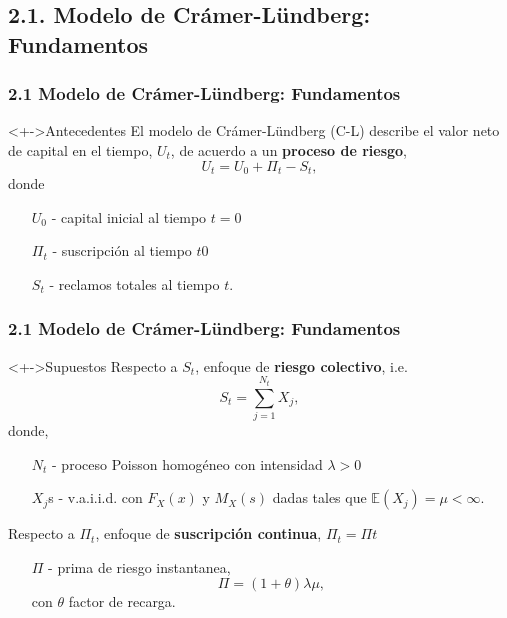 \documentclass[cjk,t,compress]{beamer}
\begin{document}
\subsection{2.1. Modelo de Cr\'amer-L\"undberg: Fundamentos}
\begin{frame}[fragile]
\frametitle{2.1 Modelo de Cr\'amer-L\"undberg: Fundamentos}
\scriptsize  	

\vspace{0.1cm}
\begin{block}<+->{Antecedentes}
	\vspace{0.1cm}
	El modelo de Cr\'amer-L\"undberg (C-L) describe el valor neto de capital en el tiempo, $U_t$, de acuerdo a un {\bf proceso de riesgo},
	\begin{equation}
		U_t = U_0 + \Pi_t - S_t,
	\end{equation}
	donde
	\begin{itemize}
		\item[$U_0$] - capital inicial al tiempo $t=0$
		\item[$\Pi_t$] - suscripci\'on al tiempo $t0$
		\item[$S_t$] - reclamos totales al tiempo $t$.   
	\end{itemize}
\end{block}

\end{frame}


\begin{frame}[fragile]
\frametitle{2.1 Modelo de Cr\'amer-L\"undberg: Fundamentos}
\scriptsize  	

\vspace{0.1cm}
\begin{block}<+->{Supuestos}
	\vspace{0.1cm}
	Respecto a $S_t$, enfoque de {\bf riesgo colectivo}, i.e. 
	$$
	S_t=\sum_{j=1}^{N_t}X_j, 
	$$
	donde,
	\begin{itemize}
		\item[$N_t$] - proceso Poisson homog\'eneo con intensidad $\lambda > 0$
		
		\item[$X_j$s] - v.a.i.i.d. con $F_X(x)$ y $M_X(s)$ dadas tales que $\mathbb{E}(X_j)=\mu < \infty$.  
	\end{itemize}
	
	\vspace{0.1cm}
	Respecto a $\Pi_t$, enfoque de {\bf suscripci\'on continua}, $\Pi_t=\Pi t$
	\begin{itemize}
		\item[$\Pi$] - prima de riesgo instantanea, 
		$$
		\Pi=(1+\theta)\lambda\mu,
		$$
		con $\theta$ factor de recarga.
	\end{itemize}
\end{block}

\end{frame}
\end{document}

